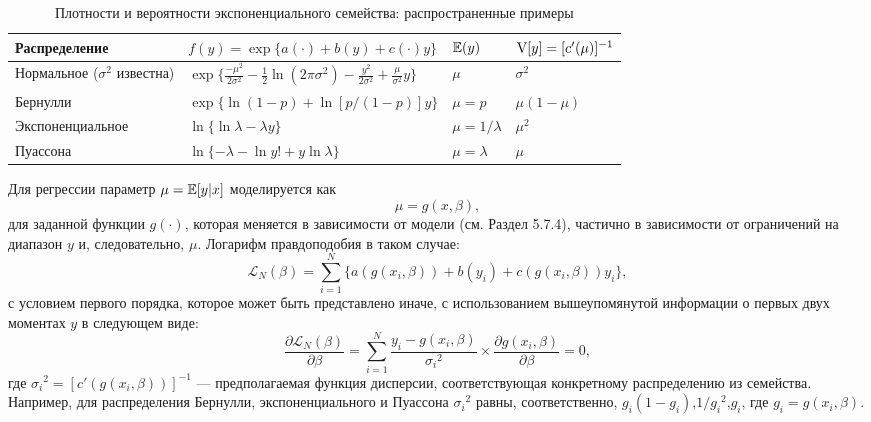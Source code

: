 \begin{table}[h]
\begin{center}
\caption{\label{tab:LEF} Плотности и вероятности экспоненциального семейства:  распространенные примеры}
\begin{tabular}[t]{llll}
\hline
\hline
\bf{Распределение} & $f(y)=\exp \{ a(\cdot)+b(y)+c(\cdot)y \}$ & $\mathbb{E}(y)$ &  $\mathrm{V}[y]=[c'(\mu)]^{-1}$ \\
\hline
Нормальное ($\sigma^2$ известна) & $\exp \{ \frac{-\mu^2}{2 \sigma^2} - \frac{1}{2} \ln(2 \pi \sigma^2)- \frac{y^2}{2 \sigma^2} + \frac{\mu}{\sigma^2} y \}$ & $\mu$ & $\sigma^2$ \\
Бернулли & $\exp \{\ln(1-p) + \ln[p/(1-p)]y \}$ & $\mu=p$ & $\mu(1-\mu)$ \\
Экспоненциальное & $\ln \{ \ln \lambda - \lambda y \}$ & $\mu=1/\lambda$ & $\mu^2$  \\
Пуассона & $\ln \{ -\lambda - \ln y! + y \ln \lambda \}$ & $\mu=\lambda$ & $\mu$ \\
\hline
\hline
\end{tabular}
\end{center}
\end{table}

Для регрессии параметр $\mu=\mathbb{E}[y|x]$ моделируется как 
\begin{equation}
\mu=g(x,\beta),
\end{equation}
для заданной функции  $g(\cdot)$, которая меняется в зависимости от модели (см. Раздел 5.7.4), частично в зависимости от ограничений на диапазон $y$ и, следовательно, $\mu$. Логарифм правдоподобия в таком случае:
\begin{equation}
\mathcal{L}_{N}(\beta)=\sum_{i=1}^{N} \{ a(g(x_i,\beta))+b(y_i)+c(g(x_i,\beta))y_i \},
\end{equation}
с условием первого порядка, которое может быть представлено иначе, с использованием вышеупомянутой информации о первых двух моментах $y$ в следующем виде:
\begin{equation}
\frac{\partial \mathcal{L}_{N}(\beta)}{\partial \beta}=\sum_{i=1}^{N} \frac{y_i-g(x_i,\beta)}{{\sigma_i}^2} \times \frac{\partial g(x_i,\beta)}{\partial \beta}=0,
\end{equation}
где ${\sigma_i}^2=[c'(g(x_i,\beta))]^{-1}$ --- предполагаемая функция дисперсии, соответствующая конкретному распределению из семейства. Например, для распределения Бернулли, экспоненциального и Пуассона ${\sigma_i}^2$ равны, соответственно, $g_i(1-g_i)$,$1/{g_i}^2$,$g_i$, где $g_i=g(x_i,\beta)$.

